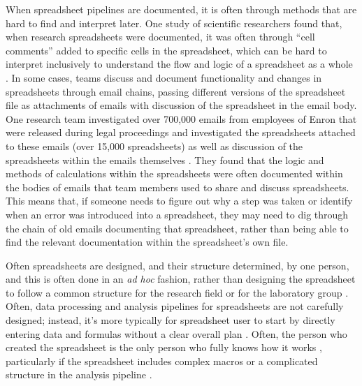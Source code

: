 \documentclass[]{tufte-book}
\begin{document}
When spreadsheet pipelines are documented, it is often through methods that are
hard to find and interpret later. One study of scientific researchers found
that, when research spreadsheets were documented, it was often through ``cell
comments'' added to specific cells in the spreadsheet, which can be hard to
interpret inclusively to understand the flow and logic of a spreadsheet as a
whole \citep{altarawneh2017pilot}. In some cases, teams discuss and document
functionality and changes in spreadsheets through email chains, passing
different versions of the spreadsheet file as attachments of emails with
discussion of the spreadsheet in the email body. One research team investigated
over 700,000 emails from employees of Enron that were released during legal
proceedings and investigated the spreadsheets attached to these emails (over
15,000 spreadsheets) as well as discussion of the spreadsheets within the emails
themselves \citep{hermans2015enron}. They found that the logic and methods of
calculations within the spreadsheets were often documented within the bodies of
emails that team members used to share and discuss spreadsheets. This means
that, if someone needs to figure out why a step was taken or identify when an
error was introduced into a spreadsheet, they may need to dig through the chain
of old emails documenting that spreadsheet, rather than being able to find the
relevant documentation within the spreadsheet's own file.

Often spreadsheets are designed, and their structure determined, by one person,
and this is often done in an \emph{ad hoc} fashion, rather than designing the
spreadsheet to follow a common structure for the research field or for the
laboratory group \citep{anderson2007issues}. Often, data processing and analysis
pipelines for spreadsheets are not carefully designed; instead, it's more
typically for spreadsheet user to start by directly entering data and formulas
without a clear overall plan \citep{altarawneh2017pilot}. Often, the person who
created the spreadsheet is the only person who fully knows how it works
\citep{myneni2010organization}, particularly if the spreadsheet includes complex
macros or a complicated structure in the analysis pipeline
\citep{creeth1985microcomputer}.
\end{document}
